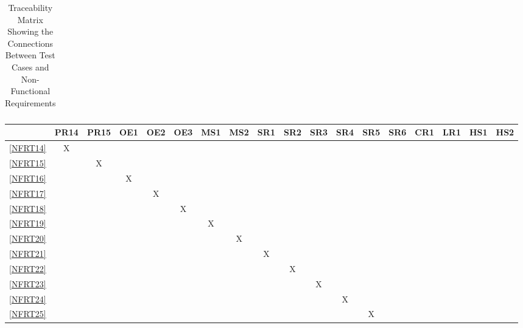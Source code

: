 \documentclass[12pt, titlepage]{article}
\begin{document}
\begin{landscape}
\begin{table}[h!]
\begin{tabular}{|c|c|c|c|c|c|c|c|c|c|c|c|c|c|c|c|c|}
    \end{tabular}
    \caption{Traceability Matrix Showing the Connections Between Test Cases
      and Non-Functional Requirements}
    \label{tab:nfrt1}
  \end{table}
  \begin{table}[h!]
    \centering
    \begin{tabular}{|c|c|c|c|c|c|c|c|c|c|c|c|c|c|c|c|c|c|} \hline
                & PR14 & PR15 & OE1 & OE2 & OE3 & MS1 & MS2 & SR1 & SR2 & SR3 & SR4 & SR5 & SR6 & CR1 & LR1 & HS1 & HS2 \\ \hline
      \ref{NFRT14} & X    &      &     &     &     &     &     &     &     &     &     &     &     &     &     &     &     \\ \hline
      \ref{NFRT15} &      & X    &     &     &     &     &     &     &     &     &     &     &     &     &     &     &     \\ \hline
      \ref{NFRT16} &      &      & X   &     &     &     &     &     &     &     &     &     &     &     &     &     &     \\ \hline
      \ref{NFRT17} &      &      &     & X   &     &     &     &     &     &     &     &     &     &     &     &     &     \\ \hline
      \ref{NFRT18} &      &      &     &     & X   &     &     &     &     &     &     &     &     &     &     &     &     \\ \hline
      \ref{NFRT19} &      &      &     &     &     & X   &     &     &     &     &     &     &     &     &     &     &     \\ \hline
      \ref{NFRT20} &      &      &     &     &     &     & X   &     &     &     &     &     &     &     &     &     &     \\ \hline
      \ref{NFRT21} &      &      &     &     &     &     &     & X   &     &     &     &     &     &     &     &     &     \\ \hline
      \ref{NFRT22} &      &      &     &     &     &     &     &     & X   &     &     &     &     &     &     &     &     \\ \hline
      \ref{NFRT23} &      &      &     &     &     &     &     &     &     & X   &     &     &     &     &     &     &     \\ \hline
      \ref{NFRT24} &      &      &     &     &     &     &     &     &     &     & X   &     &     &     &     &     &     \\ \hline
      \ref{NFRT25} &      &      &     &     &     &     &     &     &     &     &     & X   &     &     &     &     &     \\ \hline

\end{tabular}
\end{table}
\end{landscape}
\end{document}
